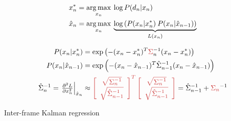 \begin{algorithm}
\begin{equation*}
\begin{aligned}
x_n^* &= \operatorname*{arg\,max}_{x_n} \: \log P(d_n|x_n) 
\\
\hat{x}_n &= \operatorname*{arg\,max}_{x_n} \: \underbrace{\log \left( P(x_n|x_n^*) \: P(x_n |\hat{x}_{n - 1}) \right)}_{L(x_n)}    
\\
\end{aligned}
\end{equation*}

\begin{equation*}
\begin{aligned}
P(x_n |x_n^*) &= \exp \left( - (x_n - x_n^* )^T \todo{\Sigma}_n^{-1}(x_n - x_n^* )\right)
\\
P(x_n |\hat{x}_{n - 1}) &= 
\exp \left( - (x_n - \hat{x}_{n - 1} )^T \hat{\Sigma}_{n - 1}^{-1} (x_n - \hat{x}_{n - 1} )\right)
\\
\hat{\Sigma}_n^{-1} = 
\left.\tfrac{\partial^2 L}{\partial x_n^2}\right|_{\hat{x}_n} &\approx 
\todo{
\left[
    \begin{array}{cc}
        \sqrt{\Sigma_n^{-1}} \\
        \sqrt{\hat{\Sigma}_{n - 1}^{-1}} \\
    \end{array}
\right]^T
\left[
    \begin{array}{c}
        \sqrt{\Sigma_n^{-1}} \\
        \sqrt{\hat{\Sigma}_{n - 1}^{-1}} \\
    \end{array}
\right]
} %
=
\hat{\Sigma}_{n-1}^{-1}  + \todo{\Sigma_{n}}^{-1}
\end{aligned}
\end{equation*}
\caption{Inter-frame Kalman regression  }
\label{alg:interframe}
\label{tab:kf-like} %
\end{algorithm}